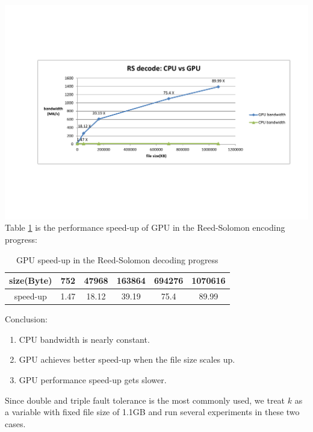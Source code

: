 \documentclass[a4paper]{article}
\begin{document}
\includegraphics[scale=0.48]{result-graph/decode-CPU-vs-GPU-graph.pdf}
Table \ref{decoding-speed-up} is the performance speed-up of GPU in the Reed-Solomon encoding progress:
\begin{table}
\caption{
GPU speed-up in the Reed-Solomon decoding progress
}
\begin{center}
\begin{tabular}{|c|c|c|c|c|c|}
\hline
size(Byte) & 752  & 47968 & 163864 & 694276 & 1070616 \\
\hline
speed-up   & 1.47 & 18.12 & 39.19  & 75.4   & 89.99 \\
\hline
\end{tabular}
\end{center}
\label{decoding-speed-up}
\end{table}

Conclusion:
\begin{enumerate}
\item CPU bandwidth is nearly constant.
\item GPU achieves better speed-up when the file size scales up.
\item GPU performance speed-up gets slower.
\end{enumerate}


Since double and triple fault tolerance is the most commonly used, we treat $k$ as a variable with fixed file size of 1.1GB and run several experiments in these two cases.
\end{document}
